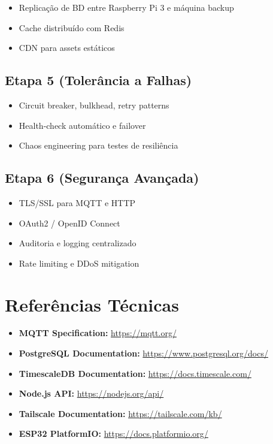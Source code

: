 \documentclass[12pt,a4paper,oneside]{report}
\begin{document}
\begin{itemize}
    \item Replicação de BD entre Raspberry Pi 3 e máquina backup
    \item Cache distribuído com Redis
    \item CDN para assets estáticos
\end{itemize}

\section{Etapa 5 (Tolerância a Falhas)}

\begin{itemize}
    \item Circuit breaker, bulkhead, retry patterns
    \item Health-check automático e failover
    \item Chaos engineering para testes de resiliência
\end{itemize}

\section{Etapa 6 (Segurança Avançada)}

\begin{itemize}
    \item TLS/SSL para MQTT e HTTP
    \item OAuth2 / OpenID Connect
    \item Auditoria e logging centralizado
    \item Rate limiting e DDoS mitigation
\end{itemize}

\newpage
\appendix

\chapter{Referências Técnicas}

\begin{itemize}
    \item \textbf{MQTT Specification:} \url{https://mqtt.org/}
    \item \textbf{PostgreSQL Documentation:} \url{https://www.postgresql.org/docs/}
    \item \textbf{TimescaleDB Documentation:} \url{https://docs.timescale.com/}
    \item \textbf{Node.js API:} \url{https://nodejs.org/api/}
    \item \textbf{Tailscale Documentation:} \url{https://tailscale.com/kb/}
    \item \textbf{ESP32 PlatformIO:} \url{https://docs.platformio.org/}
\end{itemize}
\end{document}
